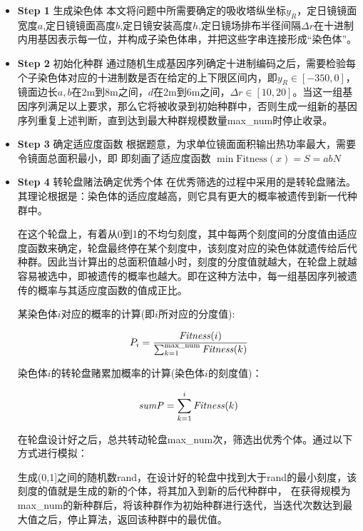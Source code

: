 \begin{itemize}
\item \textbf{Step 1} 生成染色体
本文将问题中所需要确定的吸收塔纵坐标\(y_{R}\)，定日镜镜面宽度\(a\),定日镜镜面高度\(b\),定日镜安装高度\(h\),定日镜场排布半径间隔\(\Delta r\)在十进制内用基因表示每一位，并构成子染色体串，并把这些字串连接形成“染色体”。
\bigskip
\item 
\textbf{Step 2} 初始化种群
通过随机生成基因序列确定十进制编码之后，需要检验每个子染色体对应的十进制数是否在给定的上下限区间内，即\(y_{R} \in [-350 ,0]\)，镜面边长\(a, b\)在2m到8m之间，\(d\)在2m到6m之间，\(\Delta r \in [10, 20]\)。当这一组基因序列满足以上要求，那么它将被收录到初始种群中，否则生成一组新的基因序列重复上述判断，直到达到最大种群规模数量max\_num时停止收录。
\bigskip
\item 
\textbf{Step 3} 确定适应度函数
根据题意，为求单位镜面面积输出热功率最大，需要令镜面总面积最小，即
即刻画了适应度函数 \(\min \mathrm{Fitness}(x) = S = a  b  N\)
\bigskip
\newpage
\item 
\textbf{Step 4}  转轮盘赌法确定优秀个体
在优秀筛选的过程中采用的是转轮盘赌法。其理论根据是：染色体的适应度越高，则它具有更大的概率被遗传到新一代种群中。
	
在这个轮盘上，有着从0到1的不均匀刻度，其中每两个刻度间的分度值由适应度函数来确定，轮盘最终停在某个刻度中，该刻度对应的染色体就遗传给后代种群。因此当计算出的总面积值越小时，刻度的分度值就越大，在轮盘上就越容易被选中，即被遗传的概率也越大。即在这种方法中，每一组基因序列被遗传的概率与其适应度函数的值成正比。
	
某染色体\(i\)对应的概率的计算(即\(i\)所对应的分度值):

\begin{equation}
P_{i} = \frac{{\it Fitness}(i)}{\sum_{k=1} ^{\text{max\_num}} {\it Fitness} (k)}
\end{equation}
	
染色体\(i\)的转轮盘赌累加概率的计算(染色体\(i\)的刻度值)：

\begin{equation}
{\it sum P} = \sum_{k=1} ^{i} {\it Fitness} (k)
\end{equation}

在轮盘设计好之后，总共转动轮盘max\_num次，筛选出优秀个体。通过以下方式进行模拟：

生成(0,1]之间的随机数rand，在设计好的轮盘中找到大于rand的最小刻度，该刻度的值就是生成的新的个体，将其加入到新的后代种群中，
在获得规模为max\_num的新种群后，将该种群作为初始种群进行迭代，当迭代次数达到最大值之后，停止算法，返回该种群中的最优值。
\end{itemize}


